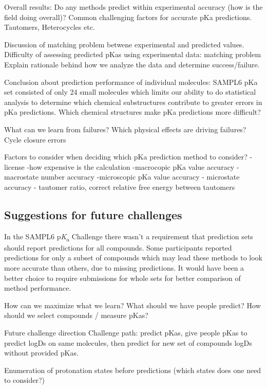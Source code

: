 \documentclass[9pt,lineno,final]{elife}
\newcommand{\pKa}{p\textit{K}\textsubscript{a}}
\begin{document}
Overall results:  
Do any methods predict within experimental accuracy (how is the field doing overall)?
Common challenging factors for accurate pKa predictions. Tautomers, Heterocycles etc.

Discussion of matching problem betwene experimental and predicted values.  
Difficulty of assessing predicted pKas using experimental data: matching problem
Explain rationale behind how we analyze the data and determine success/failure.

Conclusion about prediction performance of individual molecules:
SAMPL6 pKa set consisted of only 24 small molecules which limits our ability to do statistical analysis to determine which chemical substructures contribute to greater errors in pKa predictions.  
Which chemical structures make pKa predictions more difficult?  

What can we learn from failures? Which physical effects are driving failures?
Cycle closure errors

Factors to consider when deciding which pKa prediction method to consider?
-license
-how expensive is the calculation
-macrocopic pKa value accuracy
-macrostate number accuracy
-microscopic pKa value accuracy
- microstate accuracy
- tautomer ratio, correct relative free energy between tautomers


\subsection{Suggestions for future challenges}
In the SAMPL6 \pKa{} Challenge there wasn't a requirement that prediction sets should report predictions for all compounds. 
Some participants reported predictions for only a subset of compounds which may lead these methods to look more accurate than others, due to missing predictions.
It would have been a better choice to require submissions for whole sets for better comparison of method performance. 

How can we maximize what we learn?
What should we have people predict?
How should we select compounds / measure pKas?

Future challenge direction  
Challenge path: predict pKas, give people pKas to predict logDs on same molecules, then predict for new set of compounds logDs without provided pKas.  

Enumeration of protonation states before predictions (which states does one need to consider?)
\end{document}

